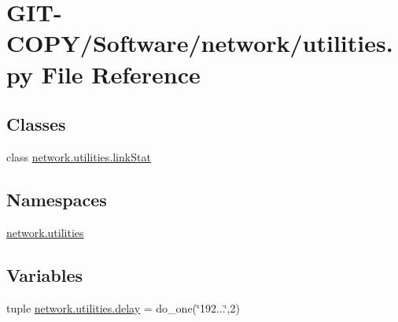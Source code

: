 \hypertarget{GIT-COPY_2Software_2network_2utilities_8py}{}\section{G\+I\+T-\/\+C\+O\+P\+Y/\+Software/network/utilities.py File Reference}
\label{GIT-COPY_2Software_2network_2utilities_8py}
\subsection*{Classes}
\begin{DoxyCompactItemize}
\item 
class \hyperlink{classnetwork_1_1utilities_1_1linkStat}{network.\+utilities.\+link\+Stat}
\end{DoxyCompactItemize}
\subsection*{Namespaces}
\begin{DoxyCompactItemize}
\item 
 \hyperlink{namespacenetwork_1_1utilities}{network.\+utilities}
\end{DoxyCompactItemize}
\subsection*{Variables}
\begin{DoxyCompactItemize}
\item 
tuple \hyperlink{namespacenetwork_1_1utilities_a17aeca60f6a33113fe34ba4db4d1cedc}{network.\+utilities.\+delay} = do\+\_\+one(\char`\"{}192...\char`\"{},2)
\end{DoxyCompactItemize}
